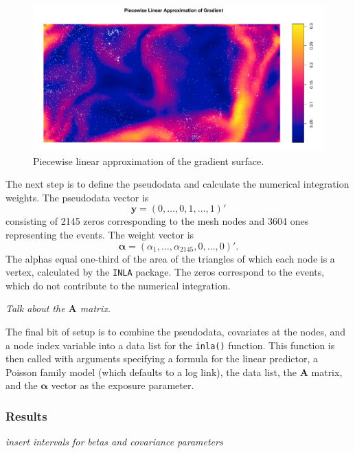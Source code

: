 \documentclass[]{interact}
\begin{document}
\begin{figure}[h]
\includegraphics[width=\textwidth]{figures/bei_grad_mesh.pdf}
\caption{Piecewise linear approximation of the gradient surface.}
\label{beigradmesh}
\end{figure}

The next step is to define the pseudodata and calculate the numerical
integration weights. The pseudodata vector is
\begin{displaymath}
\mathbf{y} = (0, \dots, 0, 1, \dots, 1)'
\end{displaymath}
consisting of 2145 zeros corresponding to the mesh nodes and 3604 ones
representing the events. The weight vector is
\begin{displaymath}
\boldsymbol{\alpha} = (\alpha_{1}, \dots, \alpha_{2145}, 0, \dots, 0)'.
\end{displaymath}
The alphas equal one-third of the area of the triangles of which each node is
a vertex, calculated by the \texttt{INLA} package. The zeros correspond to the
events, which do not contribute to the numerical integration.

{\it Talk about the \(\mathbf{A}\) matrix.}

The final bit of setup is to combine the pseudodata, covariates at the nodes,
and a node index variable into a data list for the \texttt{inla()} function.
This function is then called with arguments specifying a formula for the
linear predictor, a Poisson family model (which defaults to a log link), the
data list, the \(\mathbf{A}\) matrix, and the \(\boldsymbol{\alpha}\) vector as
the exposure parameter.


\subsubsection{Results}

{\it insert intervals for betas and covariance parameters}
\end{document}
